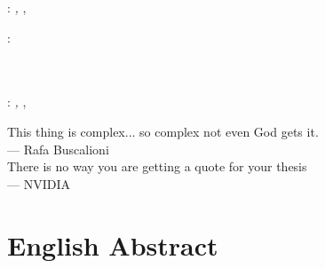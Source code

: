 \documentclass[twoside,openright,titlepage,numbers=noenddot,%
headinclude,footinclude,cleardoublepage=empty,abstract=on,
BCOR=5mm,fontsize=11pt, dvipsnames, paper=b5
]{scrreprt}
\begin{document}
\thispagestyle{empty}

\hfill

\vfill

\noindent\myName: \textit{\myTitle,} \mySubtitle, %
\textcopyright\ \myTime

\bigskip

\noindent{}: \\
\myProf \\
\myOtherProf \\
\mySupervisor

%
%
%

\thispagestyle{empty}

\hfill

\vfill

\noindent\myName: \textit{\myTitle,} \mySubtitle, %
\textcopyright\ \myTime

\cleardoublepage
\thispagestyle{empty}

\vspace*{3cm}

\begin{center}
      This thing is complex... so complex not even God gets it.\\ \medskip
    --- Rafa Buscalioni
    \\ \medskip\medskip
        There is no way you are getting a quote for your thesis\\ \medskip
    --- NVIDIA

\end{center}

\medskip

\cleardoublepage
\begingroup
\let\cleardoublepage\relax
\let\cleardoublepage\relax
\let\cleardoublepage\relax

\chapter*{English Abstract}
\end{document}
